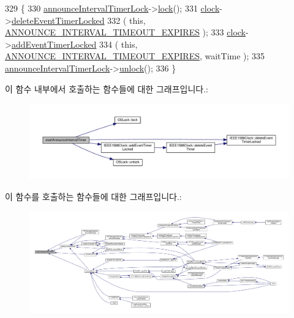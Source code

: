 \begin{DoxyCode}
329 \{
330     \hyperlink{class_common_port_a652fe375b2664ee0bedbc5c31a3556df}{announceIntervalTimerLock}->\hyperlink{class_o_s_lock_a9186992157d223030a002f3aded7aba2}{lock}();
331     \hyperlink{class_common_port_aa2bc8731fa5aeb5b033feebc2b67258c}{clock}->\hyperlink{class_i_e_e_e1588_clock_ab3079a65b0509eeb40c2828fa6a7834a}{deleteEventTimerLocked}
332         ( \textcolor{keyword}{this}, \hyperlink{ieee1588_8hpp_a5667b805d857c6d28f83f6038a0272d3acd9bfe0c66373bb54c37784519f53d3a}{ANNOUNCE\_INTERVAL\_TIMEOUT\_EXPIRES} );
333     \hyperlink{class_common_port_aa2bc8731fa5aeb5b033feebc2b67258c}{clock}->\hyperlink{class_i_e_e_e1588_clock_a4747f09108bd78ecd68d58dad4358d77}{addEventTimerLocked}
334         ( \textcolor{keyword}{this}, \hyperlink{ieee1588_8hpp_a5667b805d857c6d28f83f6038a0272d3acd9bfe0c66373bb54c37784519f53d3a}{ANNOUNCE\_INTERVAL\_TIMEOUT\_EXPIRES}, waitTime );
335     \hyperlink{class_common_port_a652fe375b2664ee0bedbc5c31a3556df}{announceIntervalTimerLock}->\hyperlink{class_o_s_lock_a5b965df44250112cac3cf967dc998bec}{unlock}();
336 \}
\end{DoxyCode}


이 함수 내부에서 호출하는 함수들에 대한 그래프입니다.\+:
\nopagebreak
\begin{figure}[H]
\begin{center}
\leavevmode
\includegraphics[width=350pt]{class_common_port_a3938df4f200087f96727e90805c543c9_cgraph}
\end{center}
\end{figure}




이 함수를 호출하는 함수들에 대한 그래프입니다.\+:
\nopagebreak
\begin{figure}[H]
\begin{center}
\leavevmode
\includegraphics[width=350pt]{class_common_port_a3938df4f200087f96727e90805c543c9_icgraph}
\end{center}
\end{figure}


